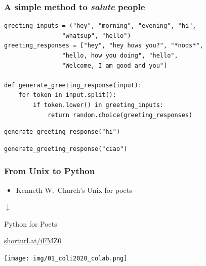 \documentclass{beamer}
\begin{document}
\begin{frame}[fragile]
\frametitle{A simple method to \textit{salute} people}
\vspace{5mm}

\begin{block}{}
\begin{verbatim}
greeting_inputs = ("hey", "morning", "evening", "hi",
                "whatsup", "hello")
greeting_responses = ["hey", "hey hows you?", "*nods*",
                "hello, how you doing", "hello",
                "Welcome, I am good and you"]

def generate_greeting_response(input):
    for token in input.split():
        if token.lower() in greeting_inputs:
            return random.choice(greeting_responses)
\end{verbatim}
\end{block}
\pause

\begin{block}{}
\begin{verbatim}
generate_greeting_response("hi")
\end{verbatim}
\end{block}
\pause 

\begin{block}{}
\begin{verbatim}
generate_greeting_response("ciao")

\end{verbatim}
\end{block}


\end{frame}



\begin{frame}

\frametitle{From Unix to Python}

\begin{itemize}
  \item Kenneth W.\ Church's \alert{Unix for poets}
\end{itemize}
\medskip
\pause

\centering

$\downarrow$
\medskip

\alert{Python for Poets}

\pause

\bigskip
\centering
\url{shorturl.at/iFMZ0}

\texttt{[image: img/01\_coli2020\_colab.png]}

\end{frame}
\end{document}
